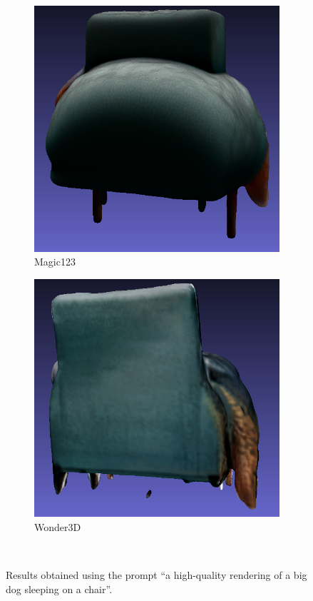 \begin{figure}[ht]
    \begin{subfigure}[b]{0.261\textwidth}
        \centering
        \includegraphics[width=\textwidth]{etc/a high-quality rendering of a big dog sleeping on a chair/magic123/magic123_dog_back_result.png}
        \caption{Magic123}
        \vspace{0.1cm}
    \end{subfigure}
    \begin{subfigure}[b]{0.27\textwidth}
        \centering
        \includegraphics[width=\textwidth]{etc/a high-quality rendering of a big dog sleeping on a chair/wonder3D/wonder3D_dog_back_result.png}
        \caption{Wonder3D}
        \vspace{0.1cm}
    \end{subfigure}
    \caption{Results obtained using the prompt ``a high-quality rendering of a big dog sleeping on a chair''.}~\label{fig:resultDogBack}
\end{figure}